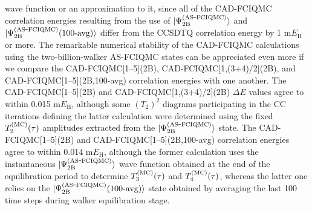 \documentclass[journal=jcp,manuscript=suppinfo]{achemso}
\begin{document}
wave function or an approximation to it, since all of the CAD-FCIQMC correlation energies resulting
from the use of $|\Psi_{\rm 2B}^{\rm (AS\mbox{-}FCIQMC)}\rangle$ and
$|\Psi_{\rm 2B}^{\rm (AS\mbox{-}FCIQMC)}\mbox{(100-avg)}\rangle$ differ from the CCSDTQ correlation
energy by 1 $\text{m}E_{\text{H}}$ or more. The remarkable numerical stability of the CAD-FCIQMC
calculations using the two-billion-walker AS-FCIQMC states can be appreciated even more if we
compare the CAD-FCIQMC[1--5](2B), CAD-FCIQMC[1,(3+4)/2](2B), and CAD-FCIQMC[1--5](2B,100-avg)
correlation energies with one another. The CAD-FCIQMC[1--5](2B) and CAD-FCIQMC[1,(3+4)/2](2B)
$\Delta E$ values agree to within 0.015 $\text{m}E_{\text{H}}$, although some $(T_2)^{2}$ diagrams
participating in the CC iterations defining the latter calculation were determined using the fixed
$T_{2}^{\rm (MC)}(\tau)$ amplitudes extracted from the $|\Psi_{\rm 2B}^{\rm (AS\mbox{-}FCIQMC)}\rangle$
state. The CAD-FCIQMC[1--5](2B) and CAD-FCIQMC[1--5](2B,100-avg) correlation energies
agree to within 0.014 $\text{m}E_{\text{H}}$, although the former calculation uses the
instantaneous $|\Psi_{\rm 2B}^{\rm (AS\mbox{-}FCIQMC)}\rangle$ wave function obtained at the end
of the equilibration period to determine $T_{3}^{\rm (MC)}(\tau)$ and $T_{4}^{\rm (MC)}(\tau)$,
whereas the latter one relies on the $|\Psi_{\rm 2B}^{\rm (AS\mbox{-}FCIQMC)}\mbox{(100-avg)}\rangle$
state obtained by averaging the last 100 time steps during walker equilibration stage.
\end{document}
